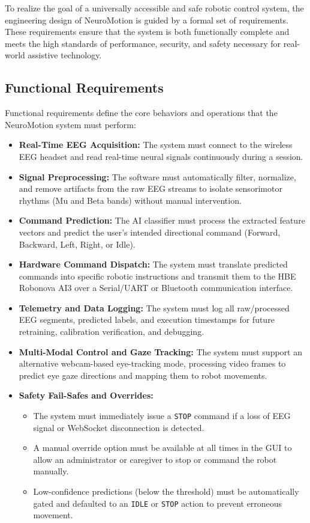 \documentclass[12pt, a4paper, oneside]{report}
\begin{document}
To realize the goal of a universally accessible and safe robotic control system, the engineering design of NeuroMotion is guided by a formal set of requirements. These requirements ensure that the system is both functionally complete and meets the high standards of performance, security, and safety necessary for real-world assistive technology.

\subsection{Functional Requirements}

Functional requirements define the core behaviors and operations that the NeuroMotion system must perform:

\begin{itemize}
    \item \textbf{Real-Time EEG Acquisition:} The system must connect to the wireless EEG headset and read real-time neural signals continuously during a session.
    \item \textbf{Signal Preprocessing:} The software must automatically filter, normalize, and remove artifacts from the raw EEG streams to isolate sensorimotor rhythms (Mu and Beta bands) without manual intervention.
    \item \textbf{Command Prediction:} The AI classifier must process the extracted feature vectors and predict the user's intended directional command (Forward, Backward, Left, Right, or Idle).
    \item \textbf{Hardware Command Dispatch:} The system must translate predicted commands into specific robotic instructions and transmit them to the HBE Robonova AI3 over a Serial/UART or Bluetooth communication interface.
    \item \textbf{Telemetry and Data Logging:} The system must log all raw/processed EEG segments, predicted labels, and execution timestamps for future retraining, calibration verification, and debugging.
    \item \textbf{Multi-Modal Control and Gaze Tracking:} The system must support an alternative webcam-based eye-tracking mode, processing video frames to predict eye gaze directions and mapping them to robot movements.
    \item \textbf{Safety Fail-Safes and Overrides:}
    \begin{itemize}
        \item The system must immediately issue a \texttt{STOP} command if a loss of EEG signal or WebSocket disconnection is detected.
        \item A manual override option must be available at all times in the GUI to allow an administrator or caregiver to stop or command the robot manually.
        \item Low-confidence predictions (below the threshold) must be automatically gated and defaulted to an \texttt{IDLE} or \texttt{STOP} action to prevent erroneous movement.
    \end{itemize}
\end{itemize}
\end{document}
